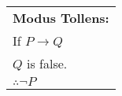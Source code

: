 \documentclass[convert,float=true,crop=true]{standalone}
\begin{document}

\parbox[t][60px][c]{90px}{
\begin{tabular}{l}
\textbf{Modus Tollens:}\\
If $P \rightarrow  Q$\\
$Q$ is false.\\
$\therefore \neg P$
\end{tabular}
}
\end{document}
